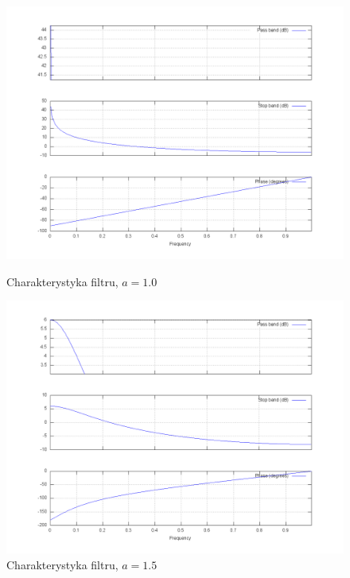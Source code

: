 \documentclass[wide,a4paper,titlepage,12pt]{mwart}
\begin{document}
  \begin{figure}[htbp]
    \begin{center}
      \includegraphics[scale=.3]{out/fig13.png}
      \caption{\label{fig13} Charakterystyka filtru, $a=1.0$}
      \includegraphics[scale=.3]{out/fig14.png}
      \caption{\label{fig14} Charakterystyka filtru, $a=1.5$}

    \end{center}
  \end{figure}
\end{document}

